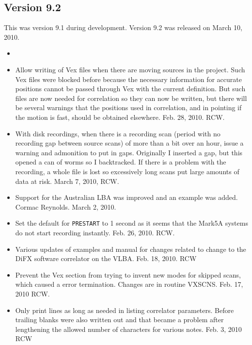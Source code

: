 \documentclass{report}
\begin{document}
\subsection{\label{SSEC:VER_9.2}Version 9.2}

This was version 9.1 during development.  Version 9.2 was released
on March 10, 2010.

\begin{itemize}

\item

\item Allow writing of Vex files when there are moving sources in the
project.  Such Vex files were blocked before because the necessary
information for accurate positions cannot be passed through Vex with
the current definition.  But such files are now needed for correlation
so they can now be written, but there will be several warnings that
the positions used in correlation, and in pointing if the motion is
fast, should be obtained elsewhere.  Feb. 28, 2010.  RCW.

\item With disk recordings, when there is a recording scan (period
with no recording gap between source scans) of more than a bit over an
hour, issue a warning and admonition to put in gaps.  Originally I
inserted a gap, but this opened a can of worms so I backtracked.  If
there is a problem with the recording, a whole file is lost so
excessively long scans put large amounts of data at risk.  March 7,
2010, RCW.

\item Support for the Australian LBA was improved and an example was
added.  Cormac Reynolds.  March 2, 2010.

\item Set the default for {\tt PRESTART} to 1 second as it seems that
the Mark5A systems do not start recording instantly.  Feb. 26, 2010.  RCW.

\item Various updates of examples and manual for changes related to
change to the DiFX software correlator on the VLBA.  Feb. 18, 2010. RCW

\item Prevent the Vex section from trying to invent new modes for
skipped scans, which caused a error termination.  Changes are in
routine VXSCNS.  Feb. 17, 2010 RCW.

\item Only print lines as long as needed in listing correlator parameters.
Before trailing blanks were also written out and that became a problem
after lengthening the allowed number of characters for various notes.
Feb. 3, 2010  RCW


\end{itemize}
\end{document}

